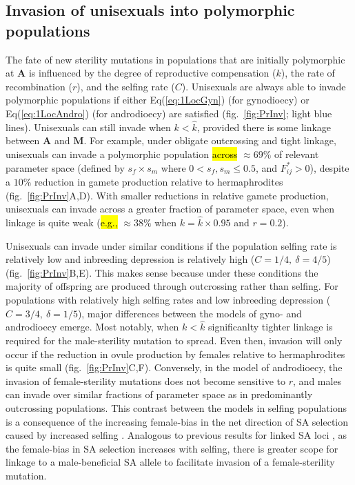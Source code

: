 \documentclass[9pt,twocolumn,twoside,lineno]{gsajnl}
\begin{document}
\subsection{Invasion of unisexuals into polymorphic populations}

The fate of new sterility mutations in populations that are initially polymorphic at $\mathbf{A}$ is influenced by the degree of reproductive compensation ($k$), the rate of recombination ($r$), and the selfing rate ($C$). Unisexuals are always able to invade polymorphic populations if either Eq(\ref{eq:1LocGyn}) (for gynodioecy) or Eq(\ref{eq:1LocAndro}) (for androdioecy) are satisfied (fig.~\ref{fig:PrInv}; light blue lines). Unisexuals can still invade when $k < \hat{k}$, provided there is some linkage between $\mathbf{A}$ and $\mathbf{M}$. For example, under obligate outcrossing and tight linkage, unisexuals can invade a polymorphic population \hl{across} $\approx 69\%$ of relevant parameter space (defined by $s_f \times s_m$ where $0 < s_f,s_m \leq 0.5$, and $F^{\ast}_{ij} > 0$), despite a $10\%$ reduction in gamete production relative to hermaphrodites (fig.~\ref{fig:PrInv}A,D). With smaller reductions in relative gamete production, unisexuals can invade across a greater fraction of parameter space, even when linkage is quite weak (\hl{e.g.,} $\approx 38\%$ when $k = \hat{k} \times 0.95 $ and $r = 0.2$). 

Unisexuals can invade under similar conditions if the population selfing rate is relatively low and inbreeding depression is relatively high ($C = 1/4,~\delta = 4/5$) (fig.~\ref{fig:PrInv}B,E). This makes sense because under these conditions the majority of offspring are produced through outcrossing rather than selfing. For populations with relatively high selfing rates and low inbreeding depression ($C = 3/4,~\delta = 1/5$), major differences between the models of gyno- and androdioecy emerge. Most notably, when $k < \hat{k}$ significanlty tighter linkage is required for the male-sterility mutation to spread. Even then, invasion will only occur if the reduction in ovule production by females relative to hermaphrodites is quite small (fig.~\ref{fig:PrInv}C,F). Conversely, in the model of androdioecy, the invasion of female-sterility mutations does not become sensitive to $r$, and males can invade over similar fractions of parameter space as in predominantly outcrossing populations. This contrast between the models in selfing populations is a consequence of the increasing female-bias in the net direction of SA selection caused by increased selfing \citep{Charlesworth1978a,JordanConnallon2014,Olito2017}. Analogous to previous results for linked SA loci \citep{Olito2017}, as the female-bias in SA selection increases with selfing, there is greater scope for linkage to a male-beneficial SA allele to facilitate invasion of a female-sterility mutation.
\end{document}
